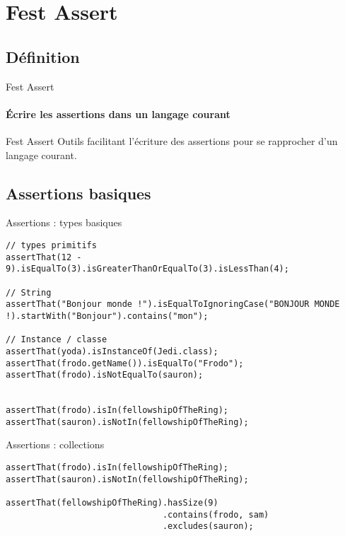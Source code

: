 \documentclass[compress]{beamer}%
\begin{document}
\section{Fest Assert}

\subsection{Définition}

\begin{frame}{Fest Assert}
	\framesubtitle{Écrire les assertions dans un langage courant}
	
	\begin{block}{Fest Assert}
		Outils facilitant l'écriture des assertions pour se rapprocher d'un langage courant.
	\end{block}

\end{frame}

\subsection{Assertions basiques}

\begin{frame}[containsverbatim]{Assertions : types basiques}
	
	\begin{lstlisting}
// types primitifs
assertThat(12 - 9).isEqualTo(3).isGreaterThanOrEqualTo(3).isLessThan(4);

// String
assertThat("Bonjour monde !").isEqualToIgnoringCase("BONJOUR MONDE !).startWith("Bonjour").contains("mon");

// Instance / classe
assertThat(yoda).isInstanceOf(Jedi.class);
assertThat(frodo.getName()).isEqualTo("Frodo");
assertThat(frodo).isNotEqualTo(sauron);


assertThat(frodo).isIn(fellowshipOfTheRing);
assertThat(sauron).isNotIn(fellowshipOfTheRing);
	\end{lstlisting}
\end{frame}


\begin{frame}[containsverbatim]{Assertions : collections}
	
	\begin{lstlisting}
assertThat(frodo).isIn(fellowshipOfTheRing);
assertThat(sauron).isNotIn(fellowshipOfTheRing);

assertThat(fellowshipOfTheRing).hasSize(9)
                               .contains(frodo, sam)
                               .excludes(sauron);
	\end{lstlisting}
\end{frame}
\end{document}
